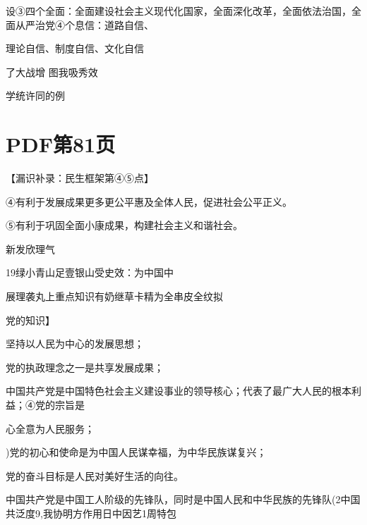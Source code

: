 \documentclass[lang=cn,11pt]{elegantbook}
\newcommand{\daofasym}[1]{{\daofasymbolfont #1}}
\newcommand{\daofasym}[1]{#1}
\begin{document}
设\daofasym{③}四个全面：全面建设社会主义现代化国家，全面深化改革，全面依法治国，全面从严治党\daofasym{④}个息信：道路自信、\par

理论自信、制度自信、文化自信\par

了大战增 图我吸秀效\par

学统许同的例\par


\section*{PDF第81页}

【漏识补录：民生框架第\daofasym{④}\daofasym{⑤}点】\par

\daofasym{④}有利于发展成果更多更公平惠及全体人民，促进社会公平正义。\par

\daofasym{⑤}有利于巩固全面小康成果，构建社会主义和谐社会。\par

新发欣理气\par

19绿小青山足壹银山受史效：为中国中\par

展理袭丸上重点知识有奶继草卡精为全串皮全纹拟\par

党的知识】\par

坚持以人民为中心的发展思想；\par

党的执政理念之一是共享发展成果；\par

中国共产党是中国特色社会主义建设事业的领导核心；代表了最广大人民的根本利益；\daofasym{④}党的宗旨是\par

心全意为人民服务；\par

)党的初心和使命是为中国人民谋幸福，为中华民族谋复兴；\par

党的奋斗目标是人民对美好生活的向往。\par

中国共产党是中国工人阶级的先锋队，同时是中国人民和中华民族的先锋队(2中国共泛度9,我协明方作用日中因艺1周特包\par
\end{document}
